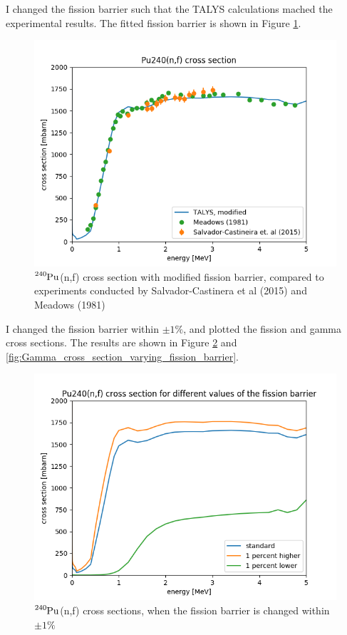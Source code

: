 \documentclass[]{article}
\begin{document}
I changed the fission barrier such that the TALYS calculations mached the experimental results. The fitted fission barrier is shown in Figure \ref{fig:Modified_TALYS_gamma_xs_vs_exp}.

  \begin{figure} [H]
	\centering
	\includegraphics[scale=0.7]{Modified_TALYS_fission_xs_vs_exp.png}
	\caption{ $\ce{^{240}Pu}$(n,f) cross section with modified fission barrier, compared to experiments conducted by Salvador-Castinera et al (2015) and Meadows (1981) }
	\label{fig:Modified_TALYS_gamma_xs_vs_exp}
\end{figure}

I changed the fission barrier within $\pm 1 \%$, and plotted the fission and gamma cross sections. The results are shown in Figure \ref{fig:Fission_cross_section_varying_fission_barrier} and \ref{fig:Gamma_cross_section_varying_fission_barrier}.

  \begin{figure} [H]
	\centering
	\includegraphics[scale=0.7]{Fission_cross_section_varying_fission_barrier.png}
	\caption{ $\ce{^{240}Pu}$(n,f) cross sections, when the fission barrier is changed within $\pm 1 \%$ }
	\label{fig:Fission_cross_section_varying_fission_barrier}
\end{figure}
\end{document}

